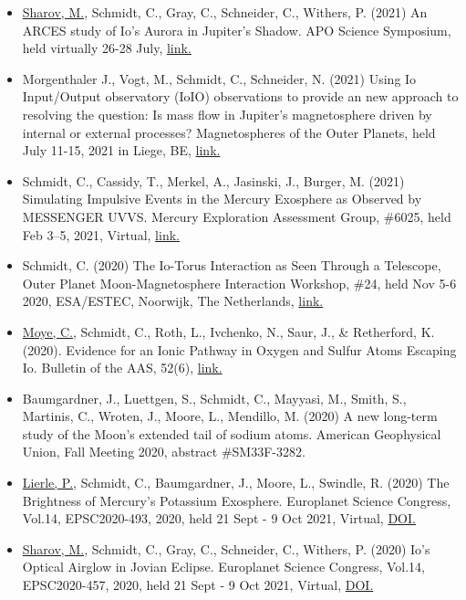 \documentclass[12pt]{report}
\begin{document}
 \begin{itemize} \itemsep -2pt %
   \item \underline{Sharov, M.}, Schmidt, C., Gray, C., Schneider, C., Withers, P. (2021) An ARCES study of Io's Aurora in Jupiter’s Shadow. APO Science Symposium, held virtually 26-28 July, \href{ http://astronomy.nmsu.edu/aposcisymposium21/}{link.} 
   \item Morgenthaler J., Vogt, M., Schmidt, C., Schneider, N. (2021) Using Io Input/Output observatory (IoIO) observations to provide an new approach to resolving the question: Is mass flow in Jupiter's magnetosphere driven by internal or external processes? Magnetospheres of the Outer Planets, held July 11-15, 2021 in Liege, BE, \href{ https://www.mop.uliege.be/}{link.} 
   \item Schmidt, C., Cassidy, T., Merkel, A., Jasinski, J., Burger, M. (2021) Simulating Impulsive Events in the Mercury Exosphere as Observed by MESSENGER UVVS. Mercury Exploration Assessment Group, \#6025, held Feb 3–5, 2021, Virtual, \href{https://www.hou.usra.edu/meetings/mexag2021/pdf/mexag2021_program.htm#sess201}{link.} 
   \item Schmidt, C. (2020) The Io-Torus Interaction as Seen Through a Telescope, Outer Planet Moon-Magnetosphere Interaction Workshop, \#24, held Nov 5-6 2020, ESA/ESTEC, Noorwijk, The Netherlands, \href{https://indico.esa.int/event/337/contributions/5611/contribution.pdf}{link.} 
   \item \underline{Moye, C.}, Schmidt, C., Roth, L., Ivchenko, N., Saur, J., \& Retherford, K. (2020). Evidence for an Ionic Pathway in Oxygen and Sulfur Atoms Escaping Io. Bulletin of the AAS, 52(6), \href{https://baas.aas.org/pub/2020n6i318p02}{link.}
   \item Baumgardner, J., Luettgen, S., Schmidt, C., Mayyasi, M., Smith, S., Martinis, C., Wroten, J., Moore, L., Mendillo, M. (2020) A new long-term study of the Moon’s extended tail of sodium atoms. American Geophysical Union, Fall Meeting 2020, abstract \#SM33F-3282.
   \item \underline{Lierle, P.}, Schmidt, C., Baumgardner, J., Moore, L., Swindle, R. (2020) The Brightness of Mercury's Potassium Exosphere. Europlanet Science Congress, Vol.14, EPSC2020-493, 2020, held 21 Sept - 9 Oct 2021, Virtual, \href{https://doi.org/10.5194/epsc2020-493}{DOI.}
   \item \underline{Sharov, M.}, Schmidt, C., Gray, C., Schneider, C., Withers, P. (2020) Io's Optical Airglow in Jovian Eclipse. Europlanet Science Congress, Vol.14, EPSC2020-457, 2020, held 21 Sept - 9 Oct 2021, Virtual, \href{https://doi.org/10.5194/epsc2020-457}{DOI.}

\end{itemize}
\end{document}

